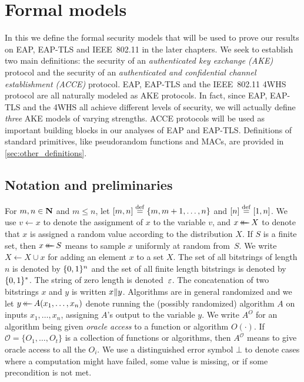 \chapter{Formal models}\label{sec:definitions}


\begingroup
\hypersetup{linkcolor=black}
\minitoc
\endgroup

\vspace{1ex}


In this  we define the formal security models that will be used to prove our results on EAP, EAP-TLS and IEEE~802.11 in the later chapters.
We seek to establish two main definitions:
the security of an \emph{authenticated key exchange (AKE)} protocol and the security of an \emph{authenticated and confidential channel establishment (ACCE)} protocol.
EAP, EAP-TLS and the IEEE~802.11 4WHS protocol are all naturally modeled as AKE  protocols.
In fact,
since EAP, EAP-TLS and the 4WHS all achieve different levels of security,
we will actually define \emph{three} AKE models of varying strengths.
ACCE protocols will be used as important building blocks in our analyses of EAP and EAP-TLS.
Definitions of standard primitives,
like pseudorandom functions and MACs,
are provided in \cref{sec:other_definitions}. 








\section{Notation and preliminaries}
For $m,n \in \mathbf{N}$ and $m \leq n$, 
let $[m,n] \overset{\mathrm{def}}{=} \lbrace m, m+1, \dotsc, n \rbrace$ and $[n] \overset{\mathrm{def}}{=} [1, n]$.
We use $v \gets x$ to denote the assignment of $x$ to the variable $v$,
and  $x \operatorname{\leftarrow\mathrel{\mkern-14mu}\leftarrow} X$ to denote that $x$ is assigned a random value according to the distribution $X$.
If $S$ is a finite set, then $x \operatorname{\leftarrow\mathrel{\mkern-14mu}\leftarrow} S$ means to sample $x$ uniformly at random from~$S$.
We write $X \gets X \cup x$ for adding an element $x$ to a set $X$.
The set of all bitstrings of length $n$ is denoted by $\lbrace 0, 1 \rbrace^n$
and the set of all finite length bitstrings is denoted by $\lbrace 0, 1 \rbrace^*$.
The string of zero length is denoted~$\varepsilon$.
The concatenation of two bitstrings $x$ and $y$ is written $x \| y$.
Algorithms are in general randomized and we let $y \operatorname{\leftarrow\mathrel{\mkern-14mu}\leftarrow} A(x_1, \dotsc, x_n)$ denote running the (possibly randomized) algorithm $A$ on inputs $x_1, \dotsc, x_n$,
assigning $A$'s output to the variable $y$.
We write $A^O$ for an algorithm being given \emph{oracle access} to a function or algorithm $O(\cdot)$.
If $\mathcal{O} = \lbrace O_1, \dotsc, O_t \rbrace$ is a collection of functions or algorithms,
then $A^{\mathcal{O}}$ means to give oracle access to all the $O_i$.
We use a distinguished error symbol $\bot$ to denote cases where a computation might have failed,
some value is missing, or if some precondition is not met.


